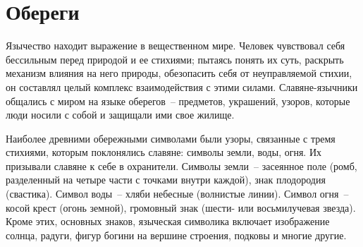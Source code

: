 \documentclass[pscyr,titlepage,chapters]{hedreport}
\begin{document}
  \chapter{Обереги}
  
  Язычество находит выражение в вещественном мире. Человек чувствовал себя
  бессильным перед природой и ее стихиями; пытаясь понять их суть, раскрыть
  механизм влияния на него природы, обезопасить себя от неуправляемой стихии, он
  составлял целый комплекс взаимодействия с этими силами. Славяне-язычники
  общались с миром на языке оберегов~-- предметов, украшений, узоров, которые
  люди носили с собой и защищали ими свое жилище.

  Наиболее древними обережными символами были узоры, связанные с тремя стихиями,
  которым поклонялись славяне: символы земли, воды, огня. Их призывали славяне к
  себе в охранители. Символы земли~-- засеянное поле (ромб, разделенный на
  четыре части с точками внутри каждой), знак плодородия (свастика). Символ
  воды~-- хляби небесные (волнистые линии). Символ огня~-- косой крест (огонь
  земной), громовный знак (шести- или восьмилучевая звезда). Кроме этих,
  основных знаков, языческая символика включает изображение солнца, радуги,
  фигур богини на вершине строения, подковы и многие другие.
\end{document}
